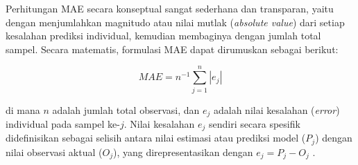 Perhitungan MAE secara konseptual sangat sederhana dan transparan, yaitu dengan menjumlahkan magnitudo atau nilai mutlak (\textit{absolute value}) dari setiap kesalahan prediksi individual, kemudian membaginya dengan jumlah total sampel. Secara matematis, formulasi MAE dapat dirumuskan sebagai berikut:

\begin{equation}
    MAE = n^{-1} \sum_{j=1}^{n} |e_j|
\end{equation}
\vspace{1em}

di mana $n$ adalah jumlah total observasi, dan $e_j$ adalah nilai kesalahan (\textit{error}) individual pada sampel ke-$j$. Nilai kesalahan $e_j$ sendiri secara spesifik didefinisikan sebagai selisih antara nilai estimasi atau prediksi model ($P_j$) dengan nilai observasi aktual ($O_j$), yang direpresentasikan dengan $e_j = P_j - O_j$ \cite{willmott2005advantages}.
